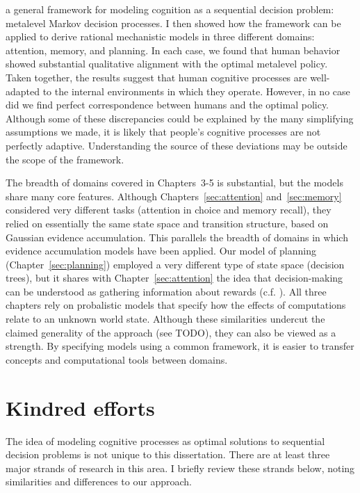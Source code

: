 \label{conclusion}

 a general framework for modeling cognition as a sequential decision problem: metalevel Markov decision processes. I then showed how the framework can be applied to derive rational mechanistic models in three different domains: attention, memory, and planning. In each case, we found that human behavior showed substantial qualitative alignment with the optimal metalevel policy. Taken together, the results suggest that human cognitive processes are well-adapted to the internal environments in which they operate. However, in no case did we find perfect correspondence between humans and the optimal policy. Although some of these discrepancies could be explained by the many simplifying assumptions we made, it is likely that people's cognitive processes are not perfectly adaptive. Understanding the source of these deviations may be outside the scope of the framework.

The breadth of domains covered in Chapters~3-5 is substantial, but the models share many core features. Although Chapters~\ref{sec:attention} and~\ref{sec:memory} considered very different tasks (attention in choice and memory recall), they relied on essentially the same state space and transition structure, based on Gaussian evidence accumulation. This parallels the breadth of domains in which evidence accumulation models have been applied. Our model of planning (Chapter~\ref{sec:planning}) employed a very different type of state space (decision trees), but it shares with Chapter~\ref{sec:attention} the idea that decision-making can be understood as gathering information about rewards (c.f. \citealp{tajima2016optimal,sezener2019optimizing}). All three chapters rely on probalistic models that specify how the effects of computations relate to an unknown world state. Although these similarities undercut the claimed generality of the approach (see TODO), they can also be viewed as a strength. By specifying models using a common framework, it is easier to transfer concepts and computational tools between domains.

\section{Kindred efforts}

The idea of modeling cognitive processes as optimal solutions to sequential decision problems is not unique to this dissertation. There are at least three major strands of research in this area. I briefly review these strands below, noting similarities and differences to our approach.

